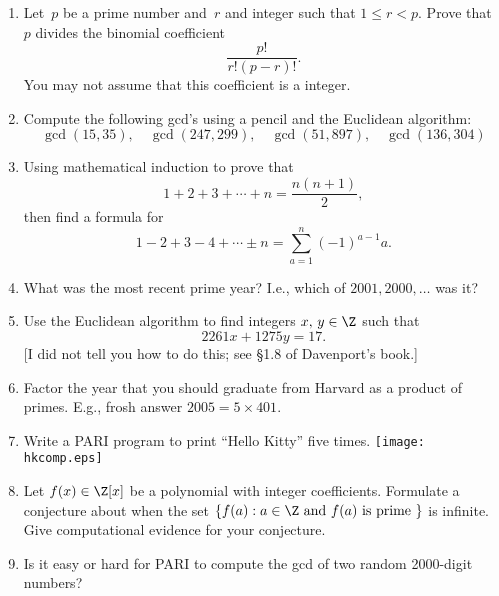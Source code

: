 \documentclass[11pt]{report}
\begin{document}
\begin{enumerate}
  \item Let~$p$ be a prime number and~$r$ and integer such that
        $1\leq r < p$. Prove that~$p$ divides the binomial
        coefficient
        $$
          \frac{p!}{r!(p-r)!}.
        $$
        You may not assume that this coefficient is a integer.

  \item Compute the following gcd's using a pencil and
        the Euclidean algorithm:
        $$
          \gcd(15,35),\quad
          \gcd(247,299),\quad
          \gcd(51,897), \quad
          \gcd(136,304)
        $$

  \item Using mathematical induction to prove that
        $$1+2+3 + \cdots + n = \frac{n(n+1)}{2},$$
        then find a formula for
        $$1 - 2 + 3 - 4 + \cdots \pm n = \sum_{a=1}^{n}(-1)^{a-1} a.$$

  \item What was the most recent prime year?
        I.e., which of $2001, 2000, \ldots$ was it?

  \item Use the Euclidean algorithm to find integers $x,\, y\in\Z$
        such that
        $$2261x + 1275y = 17.$$
        [I did not tell you how to do this; see \S1.8 of Davenport's book.]

  \item Factor the year that you should graduate from Harvard
        as a product of primes.  E.g., frosh answer $2005=5\times 401$.


  \item
        \vspace{-4ex}Write a PARI program to print ``Hello Kitty'' five times.
        \hfill \texttt{[image: hkcomp.eps]}

  \item Let $f(x)\in\Z[x]$ be a polynomial with integer coefficients.
        Formulate a conjecture about when the set
        $\{ f(a) : a \in \Z \text{ and $f(a)$ is prime }\}$
        is infinite.  Give computational evidence for your conjecture.

  \item Is it easy or hard for PARI to compute the gcd
        of two random 2000-digit numbers?


\end{enumerate}
\end{document}
